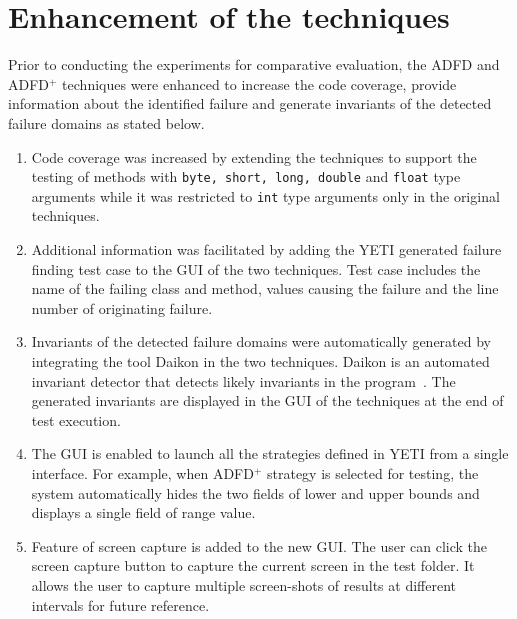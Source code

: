 \section{Enhancement of the techniques}
Prior to conducting the experiments for comparative evaluation, the ADFD and ADFD$^+$ techniques were enhanced to increase the code coverage, provide information about the identified failure and generate invariants of the detected failure domains as stated below. 
\begin{enumerate}

\item Code coverage was increased by extending the techniques to support the testing of methods with \verb+byte, short, long, double+ and \verb+float+ type arguments while it was restricted to \verb+int+ type arguments only in the original techniques.

\item Additional information was facilitated by adding the YETI generated failure finding test case to the GUI of the two techniques. Test case includes the name of the failing class and method, values causing the failure and the line number of originating failure.

\item Invariants of the detected failure domains were automatically generated by integrating the tool Daikon in the two techniques. Daikon is an automated invariant detector that detects likely invariants in the program~\cite{ernst2007daikon}. The generated invariants are displayed in the GUI of the techniques at the end of test execution. 








\item The GUI is enabled to launch all the strategies defined in YETI from a single interface. For example, when ADFD$^+$ strategy is selected for testing, the system automatically hides the two fields of lower and upper bounds and displays a single field of range value. 

\item Feature of screen capture is added to the new GUI. The user can click the screen capture button to capture the current screen in the test folder. It allows the user to capture multiple screen-shots of results at different intervals for future reference. 

\end{enumerate}
\bigskip



